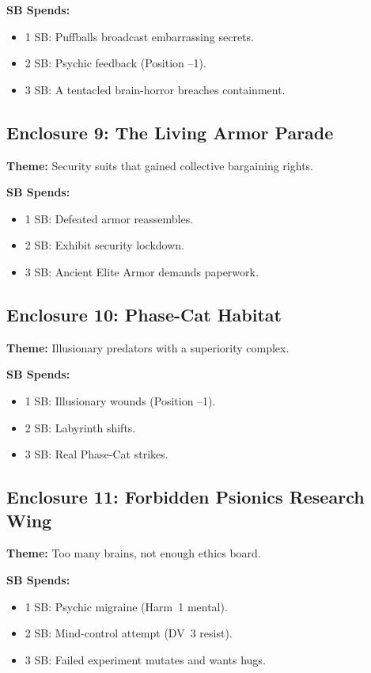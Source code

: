 \textbf{SB Spends:}
\begin{itemize}
  \item 1 SB: Puffballs broadcast embarrassing secrets.
  \item 2 SB: Psychic feedback (Position --1).
  \item 3 SB: A tentacled brain-horror breaches containment.
\end{itemize}

\subsection{Enclosure 9: The Living Armor Parade}
\textbf{Theme:} Security suits that gained collective bargaining rights.

\textbf{SB Spends:}
\begin{itemize}
  \item 1 SB: Defeated armor reassembles.
  \item 2 SB: Exhibit security lockdown.
  \item 3 SB: Ancient Elite Armor demands paperwork.
\end{itemize}

\subsection{Enclosure 10: Phase-Cat Habitat}
\textbf{Theme:} Illusionary predators with a superiority complex.

\textbf{SB Spends:}
\begin{itemize}
  \item 1 SB: Illusionary wounds (Position --1).
  \item 2 SB: Labyrinth shifts.
  \item 3 SB: Real Phase-Cat strikes.
\end{itemize}

\subsection{Enclosure 11: Forbidden Psionics Research Wing}
\textbf{Theme:} Too many brains, not enough ethics board.

\textbf{SB Spends:}
\begin{itemize}
  \item 1 SB: Psychic migraine (Harm~1 mental).
  \item 2 SB: Mind-control attempt (DV~3 resist).
  \item 3 SB: Failed experiment mutates and wants hugs.
\end{itemize}

